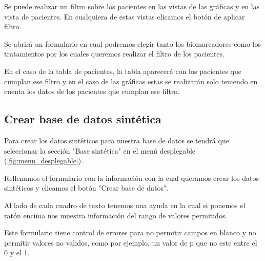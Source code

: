 Se puede realizar un filtro sobre los pacientes en las vistas de las gráficas y en las vista de pacientes. En cualquiera de estas vistas clicamos el botón de aplicar filtro.


Se abrirá un formulario en cual podremos elegir tanto los biomarcadores como los tratamientos por los cuales queremos realizar el filtro de los pacientes.


En el caso de la tabla de pacientes, la tabla aparecerá con los pacientes que cumplan ese filtro y en el caso de las gráficas estas se realizarán solo teniendo en cuenta los datos de los pacientes que cumplan ese filtro.



\subsection{Crear base de datos sintética}

Para crear los datos sintéticos para nuestra base de datos se tendrá que seleccionar la sección "Base sintética"{} en el menú desplegable (\ref{fig:menu_desplegable}).


Rellenamos el formulario con la información con la cual queramos crear los datos sintéticos y clicamos el botón "{}Crear base de datos".

Al lado de cada cuadro de texto tenemos una ayuda en la cual si ponemos el ratón encima nos muestra información del rango de valores permitidos.


Este formulario tiene control de errores para no permitir campos en blanco y no permitir valores no validos, como por ejemplo, un valor de p que no este entre el 0 y el 1.